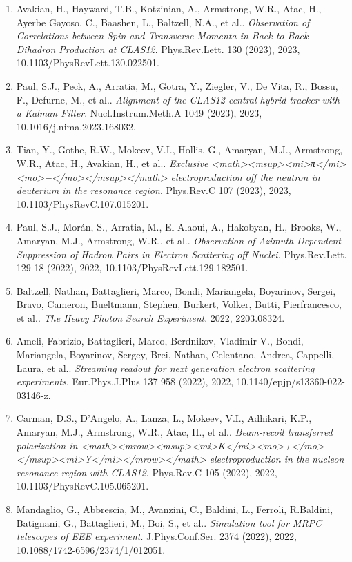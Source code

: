 \begin{enumerate}
\item Avakian, H., Hayward, T.B., Kotzinian, A., Armstrong, W.R., Atac, H., Ayerbe Gayoso, C., Baashen, L., Baltzell, N.A., et al.. \textit{Observation of Correlations between Spin and Transverse Momenta in Back-to-Back Dihadron Production at CLAS12}. Phys.Rev.Lett. 130 (2023), 2023, 10.1103/PhysRevLett.130.022501.
\item Paul, S.J., Peck, A., Arratia, M., Gotra, Y., Ziegler, V., De Vita, R., Bossu, F., Defurne, M., et al.. \textit{Alignment of the CLAS12 central hybrid tracker with a Kalman Filter}. Nucl.Instrum.Meth.A 1049 (2023), 2023, 10.1016/j.nima.2023.168032.
\item Tian, Y., Gothe, R.W., Mokeev, V.I., Hollis, G., Amaryan, M.J., Armstrong, W.R., Atac, H., Avakian, H., et al.. \textit{Exclusive <math><msup><mi>π</mi><mo>−</mo></msup></math> electroproduction off the neutron in deuterium in the resonance region}. Phys.Rev.C 107 (2023), 2023, 10.1103/PhysRevC.107.015201.
\item Paul, S.J., Morán, S., Arratia, M., El Alaoui, A., Hakobyan, H., Brooks, W., Amaryan, M.J., Armstrong, W.R., et al.. \textit{Observation of Azimuth-Dependent Suppression of Hadron Pairs in Electron Scattering off Nuclei}. Phys.Rev.Lett. 129 18 (2022), 2022, 10.1103/PhysRevLett.129.182501.
\item Baltzell, Nathan, Battaglieri, Marco, Bondi, Mariangela, Boyarinov, Sergei, Bravo, Cameron, Bueltmann, Stephen, Burkert, Volker, Butti, Pierfrancesco, et al.. \textit{The Heavy Photon Search Experiment}. 2022, 2203.08324.
\item Ameli, Fabrizio, Battaglieri, Marco, Berdnikov, Vladimir V., Bondì, Mariangela, Boyarinov, Sergey, Brei, Nathan, Celentano, Andrea, Cappelli, Laura, et al.. \textit{Streaming readout for next generation electron scattering experiments}. Eur.Phys.J.Plus 137 958 (2022), 2022, 10.1140/epjp/s13360-022-03146-z.
\item Carman, D.S., D'Angelo, A., Lanza, L., Mokeev, V.I., Adhikari, K.P., Amaryan, M.J., Armstrong, W.R., Atac, H., et al.. \textit{Beam-recoil transferred polarization in <math><mrow><msup><mi>K</mi><mo>+</mo></msup><mi>Y</mi></mrow></math> electroproduction in the nucleon resonance region with CLAS12}. Phys.Rev.C 105 (2022), 2022, 10.1103/PhysRevC.105.065201.
\item Mandaglio, G., Abbrescia, M., Avanzini, C., Baldini, L., Ferroli, R.Baldini, Batignani, G., Battaglieri, M., Boi, S., et al.. \textit{Simulation tool for MRPC telescopes of EEE experiment}. J.Phys.Conf.Ser. 2374 (2022), 2022, 10.1088/1742-6596/2374/1/012051.

\end{enumerate}
